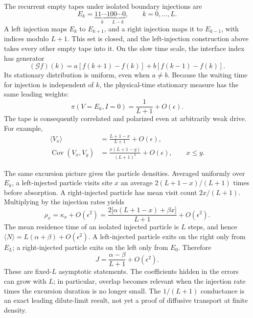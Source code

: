 \documentclass{article}
\begin{document}
The recurrent empty tapes under isolated boundary injections are
\begin{equation}
E_k=\underbrace{11\cdots1}_{k}
     \underbrace{00\cdots0}_{L-k},\qquad k=0,\ldots,L.
\end{equation}
A left injection maps $E_k$ to $E_{k+1}$, and a right injection maps it
to $E_{k-1}$, with indices modulo $L+1$.  This set is closed, and the
left-injection construction above takes every other empty tape into it.
On the slow time scale, the interface index has generator
\begin{equation}
(\mathcal G f)(k)=a[f(k+1)-f(k)]+b[f(k-1)-f(k)].
\end{equation}
Its stationary distribution is uniform, even when $a\neq b$.  Because the
waiting time for injection is independent of $k$, the physical-time
stationary measure has the same leading weights:
\begin{equation}
\boxed{\pi(V=E_k,I=0)=\frac{1}{L+1}+O(\epsilon).}
\label{eq:dilute-vacuum-measure}
\end{equation}
The tape is consequently correlated and polarized even at arbitrarily
weak drive.  For example,
\begin{align}
\langle V_x\rangle&=\frac{L+1-x}{L+1}+O(\epsilon),\\
\operatorname{Cov}(V_x,V_y)
 &=\frac{x(L+1-y)}{(L+1)^2}+O(\epsilon),\qquad x\leq y.
\end{align}

The same excursion picture gives the particle densities.  Averaged
uniformly over $E_k$, a left-injected particle visits site $x$ an average
$2(L+1-x)/(L+1)$ times before absorption.  A right-injected particle has
mean visit count $2x/(L+1)$.  Multiplying by the injection rates yields
\begin{equation}
\boxed{
\rho_x=\kappa_x+O(\epsilon^2)
 =\frac{2\bigl[\alpha(L+1-x)+\beta x\bigr]}{L+1}
  +O(\epsilon^2).
}
\label{eq:dilute-density}
\end{equation}
The mean residence time of an isolated injected particle is $L$ steps,
and hence $\langle N\rangle=L(\alpha+\beta)+O(\epsilon^2)$.
A left-injected particle exits on the right only from $E_L$; a
right-injected particle exits on the left only from $E_0$.  Therefore
\begin{equation}
\boxed{J=\frac{\alpha-\beta}{L+1}+O(\epsilon^2).}
\label{eq:dilute-current}
\end{equation}
These are fixed-$L$ asymptotic statements.  The coefficients hidden in the
errors can grow with $L$; in particular, overlap becomes relevant when the
injection rate times the excursion duration is no longer small.  The
$1/(L+1)$ conductance is an exact leading dilute-limit result, not yet a
proof of diffusive transport at finite density.
\end{document}
